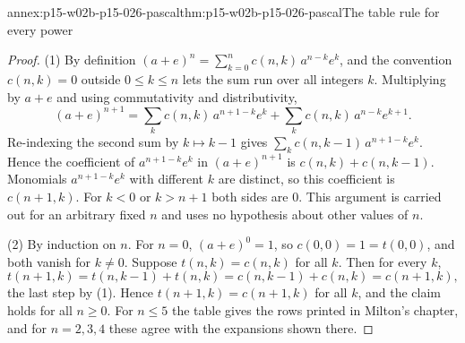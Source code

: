 \begin{annexitem}{annex:p15-w02b-p15-026-pascal}{thm:p15-w02b-p15-026-pascal}{The table rule for every power}
\begin{proof}
(1) By definition $(a+e)^n=\sum_{k=0}^{n}c(n,k)\,a^{n-k}e^k$, and the
convention $c(n,k)=0$ outside $0\leq k\leq n$ lets the sum run over all
integers $k$. Multiplying by $a+e$ and using commutativity and
distributivity,
\[
(a+e)^{n+1}=\sum_{k}c(n,k)\,a^{n+1-k}e^{k}+\sum_{k}c(n,k)\,a^{n-k}e^{k+1}.
\]
Re-indexing the second sum by $k\mapsto k-1$ gives
$\sum_k c(n,k-1)\,a^{n+1-k}e^{k}$. Hence the coefficient of
$a^{n+1-k}e^k$ in $(a+e)^{n+1}$ is $c(n,k)+c(n,k-1)$. Monomials
$a^{n+1-k}e^k$ with different $k$ are distinct, so this coefficient is
$c(n+1,k)$. For $k<0$ or $k>n+1$ both sides are $0$. This argument is
carried out for an arbitrary fixed $n$ and uses no hypothesis about other
values of $n$.

(2) By induction on $n$. For $n=0$, $(a+e)^0=1$, so $c(0,0)=1=t(0,0)$, and
both vanish for $k\neq 0$. Suppose $t(n,k)=c(n,k)$ for all $k$. Then for
every $k$,
\[
t(n+1,k)=t(n,k-1)+t(n,k)=c(n,k-1)+c(n,k)=c(n+1,k),
\]
the last step by (1). Hence $t(n+1,k)=c(n+1,k)$ for all $k$, and the claim
holds for all $n\geq 0$. For $n\leq 5$ the table gives the rows printed
in Milton's chapter, and for $n=2,3,4$ these agree with the expansions
shown there.
\end{proof}
\end{annexitem}
